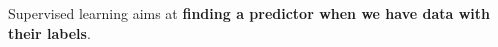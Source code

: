 Supervised learning aims at \textbf{finding a predictor when we have data with their labels}.

\vspace{5mm}